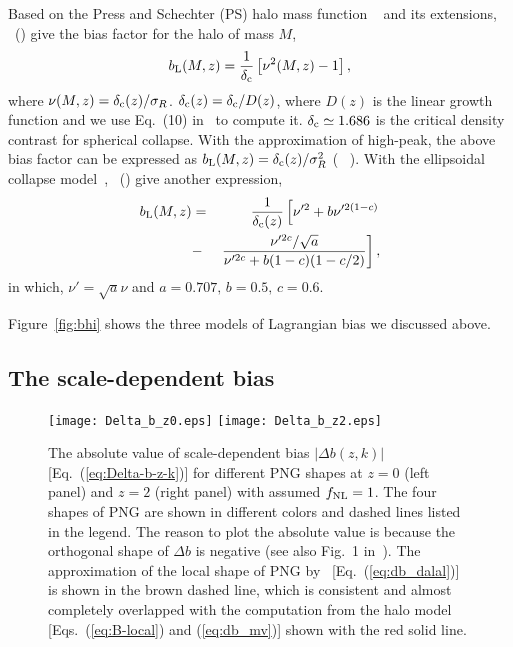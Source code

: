 \documentclass[twocolumn,floatfix,nofootinbib,aps,reprint]{revtex4}
\begin{document}
Based on the Press and Schechter (PS) halo mass function
~\cite{1974ApJ...187..425P} and its extensions, 
\citeauthor{1996MNRAS.282..347M}~(\citeyear{1996MNRAS.282..347M}) 
\citep{1996MNRAS.282..347M} give the bias factor for the halo
of mass $M$,
\begin{equation}
    b_\mathrm{L}(M,z) = \frac{1}{\delta_{\rm c}}\left[\nu^2(M,z)-1\right],
\end{equation}
where $\nu(M, z)=\delta_{\rm c}(z)/\sigma_R$. $\delta_{\rm c}(z)=\delta_{\rm c}/D(z)$,
where $D(z)$ is the linear growth function and we use Eq.~(10) in~\cite{2002MNRAS.336..112M} to compute it. $\delta_{\rm c}\simeq 1.686$ is the critical density
contrast for spherical collapse. With the approximation of high-peak, the above bias factor can be
expressed as $b_\mathrm{L}(M, z)=\delta_{\rm c}(z)/\sigma_R^2$
(\citeauthor{2008ApJ...677L..77M}~\citeyear{2008ApJ...677L..77M}
\citep{2008ApJ...677L..77M}).
With the ellipsoidal collapse model~\cite{2001MNRAS.323....1S},
\citeauthor{2002MNRAS.336..112M}~(\citeyear{2002MNRAS.336..112M})
\citep{2002MNRAS.336..112M} give 
another expression,
\begin{eqnarray}
 b_\mathrm{L}(M,z) &=& \frac{1}{\delta_{\rm c}(z)}
        \left[\nu'^2 + b\nu'^{2(1-c)} \right. \nonumber \\
        &-& \left.\frac{\nu'^{2c}/\sqrt{a}}{\nu'^{2c}+b(1-c)(1-c/2)}\right],
        \label{eq:bl}
\end{eqnarray}
in which, $\nu'=\sqrt{a}\nu$ and $a=0.707,\,b=0.5,\,c=0.6$.

Figure~\ref{fig:bhi} shows the three models of Lagrangian bias we discussed above.

\subsection{The scale-dependent bias}
\label{sec:scale-dependent}
\begin{figure*}[htb]
    \centerline{
    \texttt{[image: Delta\_b\_z0.eps]}
    \texttt{[image: Delta\_b\_z2.eps]}}
    \caption{The absolute value of scale-dependent bias $|\Delta b(z,k)|$ [Eq.~(\ref{eq:Delta-b-z-k})] for different PNG shapes at $z=0$ (left panel) and $z=2$ (right panel) with assumed $f_{\rm NL}=1$. The four shapes of PNG are shown in different colors and dashed lines listed in the legend. The reason to plot the absolute value is because the orthogonal shape of $\Delta b$ is negative (see also Fig.~1 in~\cite{Fedeli11}). The approximation of the local shape of PNG by~\citet{2008PhRvD..77l3514D} [Eq.~(\ref{eq:db_dalal})] is shown in the brown dashed line, which is consistent and almost completely overlapped with the computation from the halo model [Eqs.~(\ref{eq:B-local}) and (\ref{eq:db_mv})] shown with the red solid line.}\label{fig:db}
\end{figure*}
\end{document}
